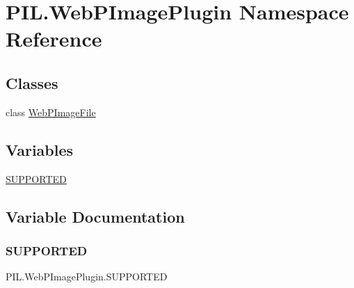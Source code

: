 \hypertarget{namespacePIL_1_1WebPImagePlugin}{}\section{P\+I\+L.\+Web\+P\+Image\+Plugin Namespace Reference}
\label{namespacePIL_1_1WebPImagePlugin}
\subsection*{Classes}
\begin{DoxyCompactItemize}
\item 
class \hyperlink{classPIL_1_1WebPImagePlugin_1_1WebPImageFile}{Web\+P\+Image\+File}
\end{DoxyCompactItemize}
\subsection*{Variables}
\begin{DoxyCompactItemize}
\item 
\hyperlink{namespacePIL_1_1WebPImagePlugin_a929c2db498e85b7a8c2f035c27bcbd34}{S\+U\+P\+P\+O\+R\+T\+ED}
\end{DoxyCompactItemize}


\subsection{Variable Documentation}
\mbox{\label{namespacePIL_1_1WebPImagePlugin_a929c2db498e85b7a8c2f035c27bcbd34}} 
\subsubsection{\texorpdfstring{S\+U\+P\+P\+O\+R\+T\+ED}{SUPPORTED}}
{\footnotesize\ttfamily P\+I\+L.\+Web\+P\+Image\+Plugin.\+S\+U\+P\+P\+O\+R\+T\+ED}

